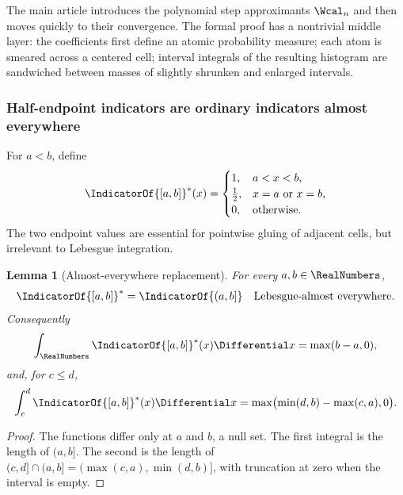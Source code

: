\documentclass[11pt,oneside]{article}
\newtheorem{lemma}[lemma]{Lemma}
\theoremstyle{definition}
\theoremstyle{remark}
\begin{document}
The main article introduces the polynomial step approximants $\Wcal_n$ and then moves quickly
to their convergence.  The formal proof has a nontrivial middle layer: the coefficients first
define an atomic probability measure; each atom is smeared across a centered cell; interval
integrals of the resulting histogram are sandwiched between masses of slightly shrunken and
enlarged intervals.

\subsubsection{Half-endpoint indicators are ordinary indicators almost everywhere}

For $a<b$, define
\begin{equation}
 \IndicatorOf{[a,b]}^{*}(x)=
 \begin{cases}
  1,&a<x<b,\\
  \tfrac12,&x=a\text{ or }x=b,\\
  0,&\text{otherwise}.
 \end{cases}
 \label{integration:eq:half-endpoint-indicator}
\end{equation}
The two endpoint values are essential for pointwise gluing of adjacent cells, but irrelevant
to Lebesgue integration.

\begin{lemma}[Almost-everywhere replacement]
\label{integration:lem:half-indicator-ae}
For every $a,b\in\RealNumbers$,
\begin{equation}
 \IndicatorOf{[a,b]}^{*}=\IndicatorOf{(a,b]}
 \quad\text{Lebesgue-almost everywhere}.
 \label{integration:eq:half-indicator-ae}
\end{equation}
Consequently
\begin{equation}
 \int_\RealNumbers\IndicatorOf{[a,b]}^{*}(x)\Differential x=\max(b-a,0),
 \label{integration:eq:half-indicator-total-integral}
\end{equation}
and, for $c\le d$,
\begin{equation}
 \int_c^d\IndicatorOf{[a,b]}^{*}(x)\Differential x
 =\max\bigl(\min(d,b)-\max(c,a),0\bigr).
 \label{integration:eq:half-indicator-overlap}
\end{equation}
\end{lemma}

\begin{proof}
The functions differ only at $a$ and $b$, a null set.  The first integral is the length of
$(a,b]$.  The second is the length of
$(c,d]\cap(a,b]=(\max(c,a),\min(d,b)]$, with truncation at zero when the interval is empty.
\end{proof}
\end{document}
